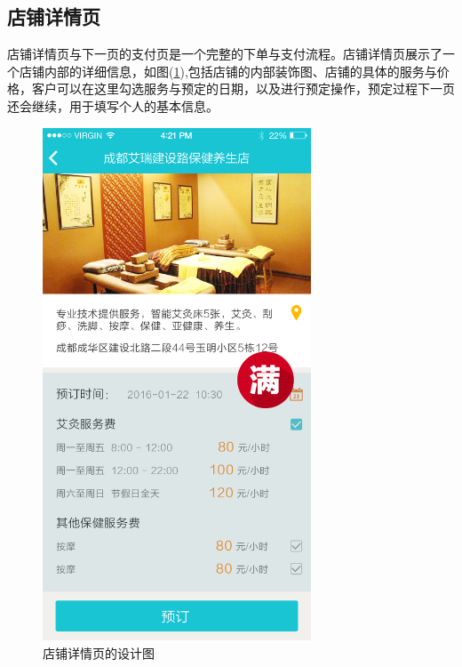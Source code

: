     \subsection{店铺详情页}
      \label{subsec:店铺详情页}
        店铺详情页与下一页的支付页是一个完整的下单与支付流程。店铺详情页展示了一个店铺内部的详细信息，如图(\ref{fig:strdetail_dsn}),包括店铺的内部装饰图、店铺的具体的服务与价格，客户可以在这里勾选服务与预定的日期，以及进行预定操作，预定过程下一页还会继续，用于填写个人的基本信息。
        \begin{figure}[htbp]
          \centering
          \includegraphics[width=8cm]{./img/strdetail_dsn.png}
          \caption{店铺详情页的设计图}
          \label{fig:strdetail_dsn}
        \end{figure}

